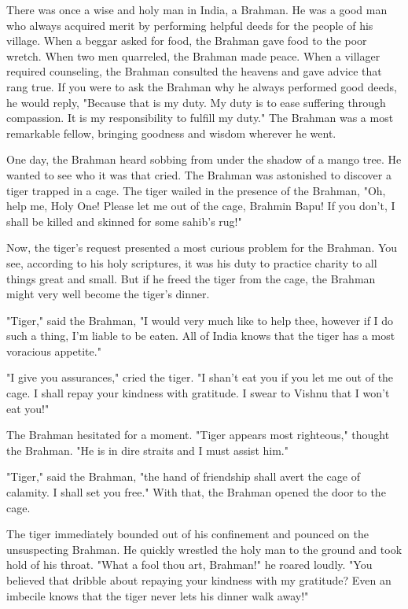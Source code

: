 There was once a wise and holy man in India, a Brahman. He was a good man who always acquired merit by performing helpful deeds for the people of his village. When a beggar asked for food, the Brahman gave food to the poor wretch. When two men quarreled, the Brahman made peace. When a villager required counseling, the Brahman consulted the heavens and gave advice that rang true. If you were to ask the Brahman why he always performed good deeds, he would reply, "Because that is my duty. My duty is to ease suffering through compassion. It is my responsibility to fulfill my duty." The Brahman was a most remarkable fellow, bringing goodness and wisdom wherever he went.

One day, the Brahman heard sobbing from under the shadow of a mango tree. He wanted to see who it was that cried. The Brahman was astonished to discover a tiger trapped in a cage. The tiger wailed in the presence of the Brahman, "Oh, help me, Holy One! Please let me out of the cage, Brahmin Bapu! If you don't, I shall be killed and skinned for some sahib's rug!"

Now, the tiger's request presented a most curious problem for the Brahman. You see, according to his holy scriptures, it was his duty to practice charity to all things great and small. But if he freed the tiger from the cage, the Brahman might very well become the tiger's dinner.

"Tiger," said the Brahman, "I would very much like to help thee, however if I do such a thing, I'm liable to be eaten. All of India knows that the tiger has a most voracious appetite."

"I give you assurances," cried the tiger. "I shan't eat you if you let me out of the cage. I shall repay your kindness with gratitude. I swear to Vishnu that I won't eat you!"

The Brahman hesitated for a moment. "Tiger appears most righteous," thought the Brahman. "He is in dire straits and I must assist him."

"Tiger," said the Brahman, "the hand of friendship shall avert the cage of calamity. I shall set you free." With that, the Brahman opened the door to the cage.

The tiger immediately bounded out of his confinement and pounced on the unsuspecting Brahman. He quickly wrestled the holy man to the ground and took hold of his throat. "What a fool thou art, Brahman!" he roared loudly. "You believed that dribble about repaying your kindness with my gratitude? Even an imbecile knows that the tiger never lets his dinner walk away!"

